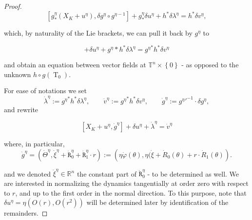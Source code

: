 \documentclass[oneside, 11pt]{amsbook}
\newcommand{\set}[1]{{\left\{#1\right\}}}
\newcommand{\pa}[1]{{\left(#1\right)}}
\newcommand{\sq}[1]{{\left[#1\right]}}
\newcommand{\T}{\mathbb{T}}
\newcommand{\R}{\mathbb{R}}
\newcommand{\teta}{\theta}
\newcommand{\pull}[1]{#1^\ast} %
\newcommand{\heta}{{\eta}}
\newcommand{\0}{{(0)}}
\newcommand{\3}{{(3)}}
\newcommand{\hp}{\hat{\varphi}}
\numberwithin{equation}{section}
\numberwithin{defn}{section}
\numberwithin{prop}{section}
\numberwithin{cor}{section}
\numberwithin{lemma}{section}
\numberwithin{rmk}{section}
\numberwithin{corollary}{section}
\newcommand{\To}{\operatorname{T}_0}
\begin{document}
\begin{proof}

\begin{equation}
 \sq{ g^\eta_*(X_K + u^\eta), \delta g^\eta\circ g^{\eta -1}} + g^\eta_*\delta u^\eta + h^*\delta\lambda^\eta = h^*\delta v^\eta,
\end{equation}

which, by naturality of the Lie brackets, we can pull it  back by $g^\eta$ to 


\begin{equation*}
   [X_K + u^\eta, {g^\eta}'^{-1} \delta g^\eta)] +  \delta u^\eta + {g^\eta}*h^*\delta\lambda^\eta = {g^\eta}^*h^* \delta v^\eta
\end{equation*}

and obtain  an equation between vector fields at $\T^n\times\set{0}$ - as opposed to the unknown $h\circ g(\To)$.

{For ease of notations we set \[\dot\lambda^\eta:=\pull{g{^\eta}}\pull{h} \delta \lambda^\eta,\qquad \dot v^\eta:=\pull{g{^\eta}}\pull{h}\delta v^\eta, \qquad \dot{g}^\eta:= g{^\eta}'^{-1}\cdot\delta g^\eta,\]}
 and rewrite 
 
 \begin{equation}\label{pullback eq}
   [X_K + u^\eta,  \dot g^\eta] +  \delta u^\eta + \dot\lambda^\eta= \dot v^\eta
\end{equation}
 
where, in particular,
$$\dot g^\eta = (\dot{\mathtt \Theta}^\eta, \dot\xi^\eta + \dot{\mathtt R}^\eta_{0} +  \dot{\mathtt R}^\eta_{1}\cdot r  ) :=  \pa{\heta \dot\varphi (\teta),{\eta}(\dot\xi + \dot R_0(\teta) + r\cdot\dot R_1(\teta)}.$$ 

and we denoted $\dot\xi^\eta\in\R^{n}$ the constant part of $\dot{\mathtt R}^\eta_{0} $ - to be determined as well. 
We are interested in normalizing the dynamics tangentially at order zero with respect to
$r$, and up to the first order in the normal direction. To this purpose,  note that $\delta u^\eta = \eta(O(r), O(r^{2}))$ will be determined later by identification of the remainders.

\medskip






\end{proof}
\end{document}
